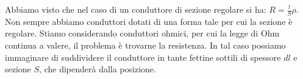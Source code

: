 Abbiamo visto che nel caso di un conduttore di sezione regolare si ha: $ R = \frac{l}{S}\rho $.
Non sempre abbiamo conduttori dotati di una forma tale per cui la sezione è regolare. Stiamo considerando conduttori ohmici, per cui la legge di Ohm continua a valere, il problema è trovarne la resistenza. In tal caso possiamo immaginare di suddividere il conduttore in tante fettine sottili di spessore $dl$ e sezione $S$, che dipenderà dalla posizione.

\begin{figure}[htpb]
	\centering

	 
	\tikzset{
	pattern size/.store in=\mcSize, 
	pattern size = 5pt,
	pattern thickness/.store in=\mcThickness, 
	pattern thickness = 0.3pt,
	pattern radius/.store in=\mcRadius, 
	pattern radius = 1pt}
	\makeatletter
	\makeatother

	\begin{tikzpicture}[x=0.75pt,y=0.75pt,yscale=-1,xscale=1]


\end{tikzpicture}
\end{figure}
